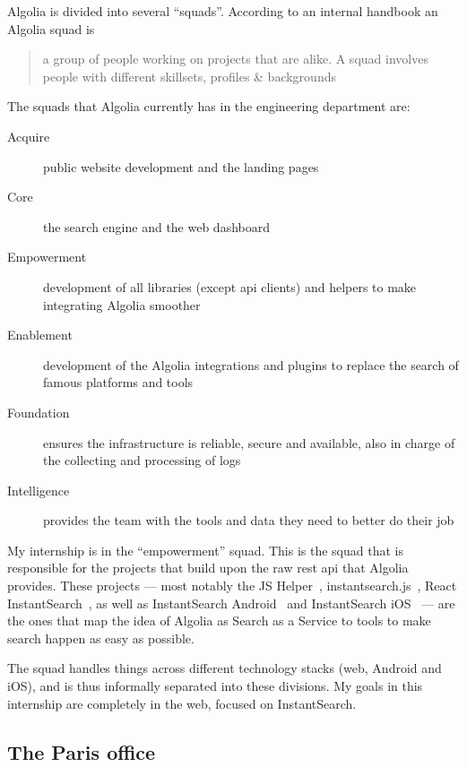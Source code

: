 Algolia is divided into several ``squads''. According to an internal handbook an Algolia squad is

\begin{quotation}
  a group of people working on projects that are alike. A squad involves people with different skillsets, profiles \& backgrounds
\end{quotation}

The squads that Algolia currently has in the engineering department are:

\begin{description}
  \item[Acquire] public website development and the landing pages
  \item[Core] the search engine and the web dashboard
  \item[Empowerment] development of all libraries (except \acrshort{api} clients) and helpers to make integrating Algolia smoother
  \item[Enablement] development of the Algolia integrations and plugins to replace the search of famous platforms and tools
  \item[Foundation] ensures the infrastructure is reliable, secure and available, also in charge of the collecting and processing of logs
  \item[Intelligence] provides the team with the tools and data they need to better do their job
\end{description}

My internship is in the ``empowerment'' squad. This is the squad that is responsible for the projects that build upon the raw \acrshort{rest} \acrshort{api} that Algolia provides. These projects --- most notably the JS Helper~\cite{algolia-js-helper}, instantsearch.js~\cite{instantsearch-js}, React InstantSearch~\cite{react-instantsearch}, as well as InstantSearch Android~\cite{instantsearch-android} and InstantSearch iOS~\cite{instantsearch-ios} --- are the ones that map the idea of Algolia as Search as a Service to tools to make search happen as easy as possible.

The squad handles things across different technology stacks (web, Android and iOS), and is thus informally separated into these divisions. My goals in this internship are completely in the web, focused on InstantSearch.

\subsection{The Paris office} %
\label{ssec:the_paris_office}

